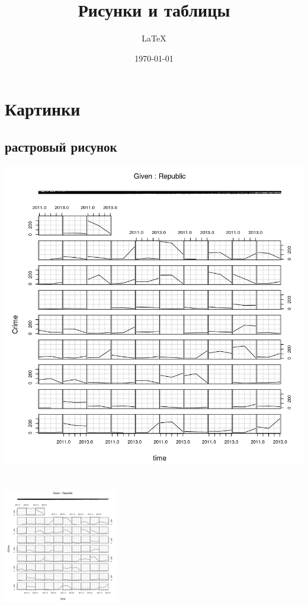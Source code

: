 \documentclass[a4paper,12pt]{article}
\author{\LaTeX}
\title{Рисунки и таблицы}
\date{\today}
\begin{document}
	\maketitle
	
\section{Картинки}

\subsection{растровый рисунок }
\includegraphics[scale = 0.3]{risunok}
\includegraphics[scale = 0.3, width = 5cm, height = 7cm]{risunok}
\end{document}
